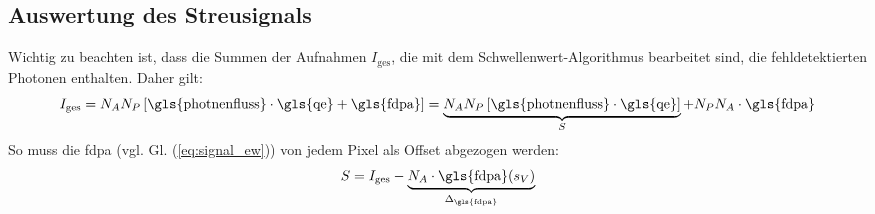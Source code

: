 \subsection{Auswertung des Streusignals}
Wichtig zu beachten ist, dass die Summen der Aufnahmen $I_\text{ges}$, die mit dem Schwellenwert-Algorithmus bearbeitet sind, die fehldetektierten Photonen enthalten. Daher gilt:
\begin{equation}
    I_\text{ges} = N_A N_P \left[\text{\gls{photnenfluss}}\cdot \text{\gls{qe}} + \text{\gls{fdpa}}\right] = \underbrace{N_A N_P \left[\text{\gls{photnenfluss}}\cdot \text{\gls{qe}}\right]}_{S} + N_P N_A\cdot\text{\gls{fdpa}}
\end{equation}
So muss die \gls{fdpa} (vgl. Gl. (\ref{eq:signal_ew})) von jedem Pixel als Offset abgezogen werden:
\begin{equation}
    S = I_\text{ges} - \underbrace{N_A\cdot\text{\gls{fdpa}}(s_V)}_{\Delta_\text{\gls{fdpa}}}
    \label{eq:signal_int_fpda}
\end{equation}

